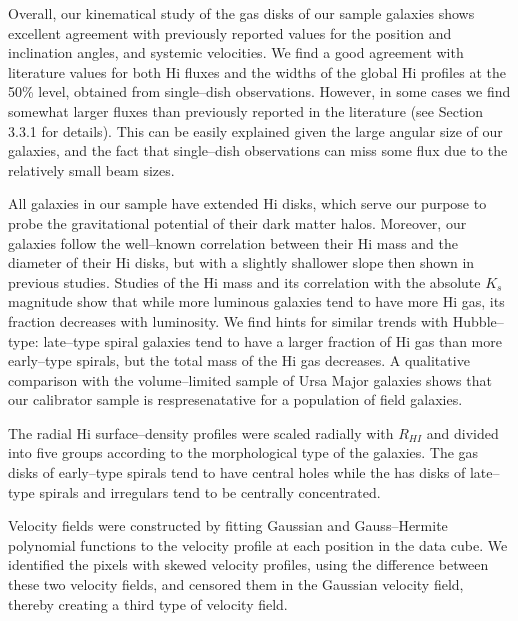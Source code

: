 \documentclass[usenatbib,useAMS]{mnras}
\begin{document}
Overall, our kinematical study of the gas disks of our sample galaxies
shows excellent agreement with previously reported values for the
position and inclination angles, and systemic velocities.  We find a
good agreement with literature values for both H{\sc i} fluxes and the
widths of the global H{\sc i} profiles at the 50\% level, obtained from
single--dish observations.  However, in some cases we find somewhat
larger fluxes than previously reported in the literature (see Section
3.3.1 for details).  This can be easily explained given the large
angular size of our galaxies, and the fact that single--dish
observations can miss some flux due to the relatively small beam sizes. 

All galaxies in our sample have extended H{\sc i} disks, which serve our
purpose to probe the gravitational potential of their dark matter halos. 
Moreover, our galaxies follow the well--known correlation between their
H{\sc i} mass and the diameter of their H{\sc i} disks, but with a
slightly shallower slope then shown in previous studies.  Studies of the
H{\sc i} mass and its correlation with the absolute $K_{s}$ magnitude
show that while more luminous galaxies tend to have more H{\sc i} gas,
its fraction decreases with luminosity.  We find hints for similar
trends with Hubble--type: late--type spiral galaxies tend to have a
larger fraction of H{\sc i} gas than more early--type spirals, but the
total mass of the H{\sc i} gas decreases.  A qualitative comparison with
the volume--limited sample of Ursa Major galaxies shows that our
calibrator sample is respresenatative for a population of field
galaxies. 

The radial H{\sc i} surface--density profiles were scaled radially with
$R_{HI}$ and divided into five groups according to the morphological
type of the galaxies.  The gas disks of early--type spirals tend to have
central holes while the has disks of late--type spirals and irregulars
tend to be centrally concentrated. 

Velocity fields were constructed by fitting Gaussian and Gauss--Hermite
polynomial functions to the velocity profile at each position in the
data cube.  We identified the pixels with skewed velocity profiles,
using the difference between these two velocity fields, and censored
them in the Gaussian velocity field, thereby creating a third type of
velocity field. 
 
\end{document}
